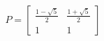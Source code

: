 \documentclass[preview]{standalone}
\begin{document}
\begin{center}
$$P = \begin{bmatrix} \frac{1 - \sqrt{5}}{2} &  \frac{1 + \sqrt{5}}{2} \\ 1 & 1 \end{bmatrix}$$
\end{center}
\end{document}
